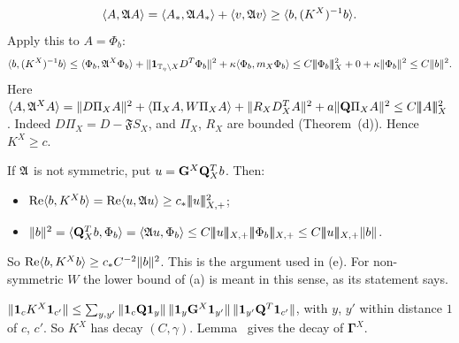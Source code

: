 \begin{detail}
\begin{step}
\[
\langle A,\mathfrak A A\rangle=\langle A_*,\mathfrak A A_*\rangle+\langle v,\mathfrak A v\rangle\ge\langle b,(K^X)^{-1}b\rangle .
\]
Apply this to $A=\Phi_b$:
\[
\langle b,(K^X)^{-1}b\rangle\le\langle \Phi_b,\mathfrak A^X\Phi_b\rangle+\|\mathbf 1_{\mathbb T_\eta\setminus X}D^T\Phi_b\|^2+\kappa\langle \Phi_b,m_X\Phi_b\rangle\le C|\!|\!|\Phi_b|\!|\!|^2_X+0+\kappa\|\Phi_b\|^2\le C\|b\|^2 .
\]
Here $\langle A,\mathfrak A^XA\rangle=\|D\Pi_XA\|^2+\langle \Pi_XA,W\Pi_XA\rangle+\|R_XD^T_XA\|^2+a\|\mathbf Q\Pi_XA\|^2\le C|\!|\!|A|\!|\!|^2_X$. Indeed $D\Pi_X=D-\mathfrak FS_X$, and $\Pi_X$, $R_X$ are bounded (Theorem~(d)). Hence $K^X\ge c$.
\end{step}
\begin{step}
If $\mathfrak A$ is not symmetric, put $u=\mathbf G^X\mathbf Q_X^Tb$. Then:
\begin{itemize}
\item $\operatorname{Re}\langle b,K^Xb\rangle=\operatorname{Re}\langle u,\mathfrak A u\rangle\ge c_*|\!|\!|u|\!|\!|^2_{X,+}$;
\item $\|b\|^2=\ip{\bQ_X^Tb}{\Phi_b}=\ip{\fA u}{\Phi_b}\le C\tn u_{X,+}\tn{\Phi_b}_{X,+}\le C\tn u_{X,+}\|b\|$.
\end{itemize}
So $\operatorname{Re}\langle b,K^Xb\rangle\ge c_*C^{-2}\|b\|^2$. This is the argument used in (e). For non-symmetric $W$ the lower bound of (a) is meant in this sense, as its statement says.
\end{step}
\begin{step}[Decay]
$\|\mathbf 1_cK^X\mathbf 1_{c'}\|\le\sum_{y,y'}\|\mathbf 1_c\mathbf Q\mathbf 1_y\|\,\|\mathbf 1_y\mathbf G^X\mathbf 1_{y'}\|\,\|\mathbf 1_{y'}\mathbf Q^T\mathbf 1_{c'}\|$, with $y$, $y'$ within distance $1$ of $c$, $c'$. So $K^X$ has decay $(C,\gamma)$. Lemma~ gives the decay of $\boldsymbol\Gamma^X$.
\end{step}
\end{detail}

